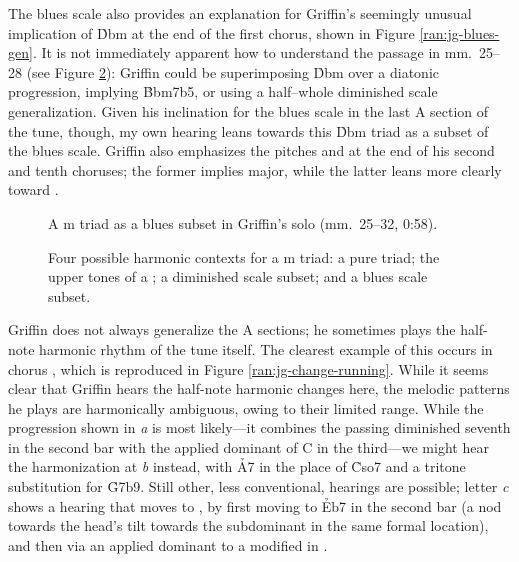 The blues scale also provides an explanation for Griffin's seemingly unusual
implication of \h{Dbm} at the end of the first chorus, shown in Figure
\ref{ran:jg-blues-gen}. It is not immediately apparent how to understand the
passage in mm.~25--28 (see Figure \ref{ran:dflat-possibilities}): Griffin
could be superimposing \h{Dbm} over a \Bflat diatonic progression, implying
\h{Bbm7b5}, or using a \Bflat half--whole diminished scale generalization.
Given his inclination for the blues scale in the last A section of the tune,
though, my own hearing leans towards this \h{Dbm} triad as a subset of the
\Bflat blues scale. Griffin also emphasizes the pitches \Dflat and \Aflat at
the end of his second and tenth choruses; the former implies \Dflat
major, while the latter leans more clearly toward \Bflat.

\begin{figure}[tbp]
  \caption[A \protect\h{Dbm} triad as a \protect\h{Bb} blues subset in
  Griffin's solo.]{%
    A \Dflat{}m triad as a \Bflat blues subset in Griffin's solo (mm.~25--32, 0:58).}
  \label{ran:jg-blues-subset}
\end{figure}

\begin{figure}[tbp]
  \caption[Four possible harmonic contexts for a \Dflat{}m triad.]{%
    Four possible harmonic contexts for a \Dflat{}m triad: a pure triad; the
    upper tones of a \protect{}; a diminished scale subset; and a
    blues scale subset.}
  \label{ran:dflat-possibilities}
\end{figure}

Griffin does not always generalize the A sections; he
sometimes plays the half-note harmonic rhythm of the tune itself. The
clearest example of this occurs in chorus , which is reproduced in Figure
\ref{ran:jg-change-running}. While it seems clear that Griffin hears the
half-note harmonic changes here, the melodic patterns he plays are harmonically
ambiguous, owing to their limited range. While the progression shown in
\emph{a} is most likely---it combines the passing diminished seventh in the
second bar with the applied dominant of C in the third---we might hear the
harmonization at \emph{b} instead, with \h{A7} in the place of \h{Cso7} and a
tritone substitution for \h{G7b9}. Still other, less conventional, hearings
are possible; letter \emph{c} shows a hearing that moves to \Eflat, by first
moving to \h{Eb7} in the second bar (a nod towards the head's tilt towards the
subdominant in the same formal location), and then via an applied dominant to
a modified \tfo in \Eflat.

